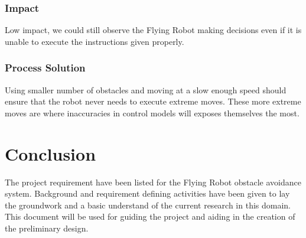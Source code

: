 \documentclass{article}
\begin{document}
		\subsubsection{Impact}
		
		Low impact, we could still observe the Flying Robot making decisions even if it is unable to execute the instructions given properly.
		
		\subsubsection{Process Solution}
		
		Using smaller number of obstacles and moving at a slow enough speed should ensure that the robot never needs to execute extreme moves. These more extreme moves are where inaccuracies in control models will exposes themselves the most. 

\section{Conclusion}

The project requirement have been listed for the Flying Robot obstacle avoidance system. Background and requirement defining activities have been given to lay the groundwork and a basic understand of the current research in this domain. This document will be used for guiding the project and aiding in the creation of the preliminary design. 


\printbibliography

\end{document}
